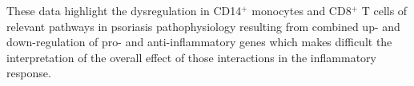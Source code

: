 \begin{figure}[htbp]
\label{figure:RNAseq_PS_CTL_CD8_TNF_and_chemokine_pathway_modified}
\end{figure}

These data highlight the dysregulation in CD14$^+$ monocytes and CD8$^+$ T cells of relevant pathways in psoriasis pathophysiology resulting from combined up- and down-regulation of pro- and anti-inflammatory genes which makes difficult the interpretation of the overall effect of those interactions in the inflammatory response.








